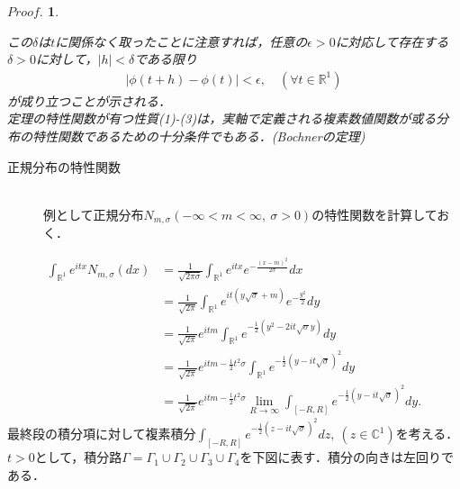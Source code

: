 \documentclass[a4j,papersize,disablejfam,slide,14pt]{jsarticle}
\newtheorem{Proof}{$Proof.$}
\def\exp#1{e^{#1}} %
\begin{document}
\begin{Proof}
\begin{description}
            
            この$\delta$は$t$に関係なく取ったことに注意すれば，任意の$\epsilon > 0$に対応して存在する$\delta > 0$に対して，$|h| < \delta$である限り
            \begin{align}
            	\left| \phi(t+h) - \phi(t) \right| < \epsilon, \quad (\forall t \in \mathbb{R}^1)
            \end{align}
            が成り立つことが示される．\\
            定理の特性関数が有つ性質(1)-(3)は，実軸で定義される複素数値関数が或る分布の特性関数であるための十分条件でもある．({\rm Bochner}の定理)
        \end{description}
    \end{Proof}
    
    \begin{screen}
    	\begin{description}
        	\item[正規分布の特性関数]\mbox{}\\
    			例として正規分布$N_{m,\sigma} (-\infty < m < \infty,\ \sigma > 0)$の特性関数を計算しておく．
        \end{description}
    \end{screen}
    
    \begin{align}
    	\int_{\mathbb{R}^1} \exp{itx} N_{m,\sigma} (dx) &= \frac{1}{\sqrt{2\pi \sigma}} \int_{\mathbb{R}^1} \exp{itx} \exp{-\frac{(x-m)^2}{2\sigma}} dx \\
        &= \frac{1}{\sqrt{2\pi}} \int_{\mathbb{R}^1} \exp{it(y\sqrt{\sigma}+m)} \exp{-\frac{y^2}{2}} dy \\
        &= \frac{1}{\sqrt{2\pi}} \exp{itm} \int_{\mathbb{R}^1} \exp{-\frac{1}{2} (y^2 - 2it\sqrt{\sigma}y)} dy \\
        &= \frac{1}{\sqrt{2\pi}} \exp{itm-\frac{1}{2} t^2\sigma} \int_{\mathbb{R}^1} \exp{-\frac{1}{2} (y - it\sqrt{\sigma})^2} dy \\
        &= \frac{1}{\sqrt{2\pi}} \exp{itm-\frac{1}{2} t^2\sigma} \lim_{R \to \infty} \int_{[-R,R]} \exp{-\frac{1}{2} (y - it\sqrt{\sigma})^2} dy.
    \end{align}
    最終段の積分項に対して複素積分$\int_{[-R,R]} \exp{-\frac{1}{2} (z - it\sqrt{\sigma})^2} dz,\ (z \in \mathbb{C}^1)$を考える．
    $t > 0$として，積分路$\Gamma = \Gamma_1 \cup \Gamma_2 \cup \Gamma_3 \cup \Gamma_4$を下図に表す．積分の向きは左回りである．
    
\end{document}
